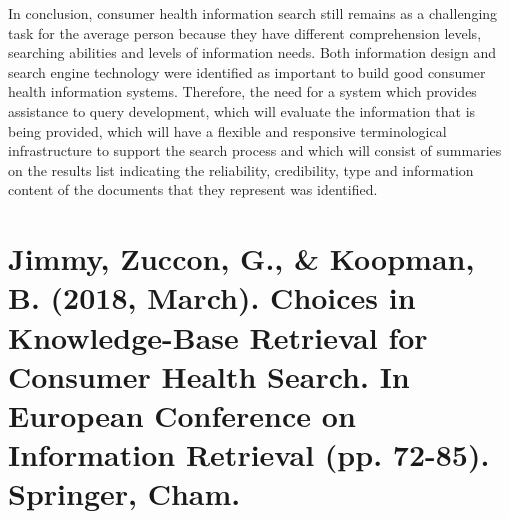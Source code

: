 \documentclass[]{article}
\begin{document}
In conclusion, consumer health information search still remains as a challenging task for the average person because they have different comprehension levels, searching abilities and levels of information needs. Both information design and search engine technology were identified as important to build good consumer health information systems. Therefore, the need for a system which provides assistance to query development, which will evaluate the information that is being provided, which will have a flexible and responsive terminological infrastructure to support the search process and which will consist of summaries on the results list indicating the  reliability, credibility, type and information content of the documents that they represent was identified.   

\section{Jimmy, Zuccon, G., \& Koopman, B. (2018, March). Choices in Knowledge-Base Retrieval for Consumer Health Search. In European Conference on Information Retrieval (pp. 72-85). Springer, Cham.}  
\end{document}
